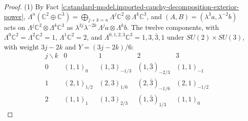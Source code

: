\documentclass[11pt]{article}
\theoremstyle{definition}
\theoremstyle{plain}
\providecommand{\C}{}\renewcommand{\C}{\mathbb{C}}
\begin{document}
\begin{proof}
(1) By Fact \ref{c:standard-model.imported-cauchy-decomposition-exterior-power}, $\Lambda^{n}(\C^{2} \oplus \C^{3}) = \bigoplus_{j+k=n}\Lambda^{j}\C^{2} \otimes \Lambda^{k}\C^{3}$, and $(A, B) = (\lambda^{3}a, \lambda^{-2}b)$ acts on $\Lambda^{j}\C^{2} \otimes \Lambda^{k}\C^{3}$ as $\lambda^{3j}\lambda^{-2k}\,\Lambda^{j}a \otimes \Lambda^{k}b$. The twelve components, with $\Lambda^{0}\C^{2} = \Lambda^{2}\C^{2} = 1$, $\Lambda^{1}\C^{2} = 2$, and $\Lambda^{0,1,2,3}\C^{3} = 1, 3, \bar{3}, 1$ under $SU(2) \times SU(3)$, with weight $3j - 2k$ and $Y = (3j-2k)/6$:
\[
\begin{array}{c|cccc}
j \backslash k & 0 & 1 & 2 & 3 \\ \hline
0 & (1,1)_{0} & (1,3)_{-1/3} & (1,\bar{3})_{-2/3} & (1,1)_{-1} \\
1 & (2,1)_{1/2} & (2,3)_{1/6} & (2,\bar{3})_{-1/6} & (2,1)_{-1/2} \\
2 & (1,1)_{1} & (1,3)_{2/3} & (1,\bar{3})_{1/3} & (1,1)_{0}
\end{array}
\]

\end{proof}
\end{document}
